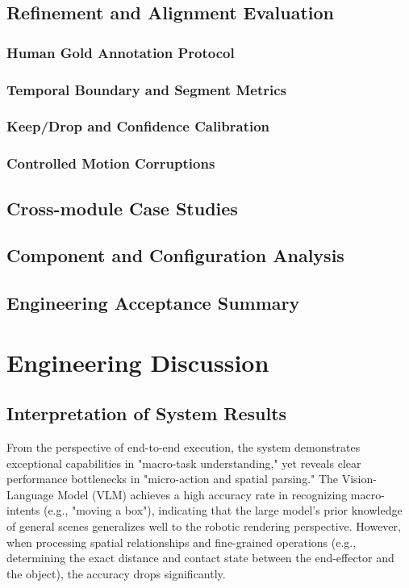 \documentclass[11pt,oneside]{report}
\begin{document}
\section{Refinement and Alignment Evaluation}
\subsection{Human Gold Annotation Protocol}
\subsection{Temporal Boundary and Segment Metrics}
\subsection{Keep/Drop and Confidence Calibration}
\subsection{Controlled Motion Corruptions}
\section{Cross-module Case Studies}
\section{Component and Configuration Analysis}
\section{Engineering Acceptance Summary}

\chapter{Engineering Discussion}

\section{Interpretation of System Results}
From the perspective of end-to-end execution, the system demonstrates exceptional capabilities in "macro-task understanding," yet reveals clear performance bottlenecks in "micro-action and spatial parsing." The Vision-Language Model (VLM) achieves a high accuracy rate in recognizing macro-intents (e.g., "moving a box"), indicating that the large model's prior knowledge of general scenes generalizes well to the robotic rendering perspective. However, when processing spatial relationships and fine-grained operations (e.g., determining the exact distance and contact state between the end-effector and the object), the accuracy drops significantly.
\end{document}
